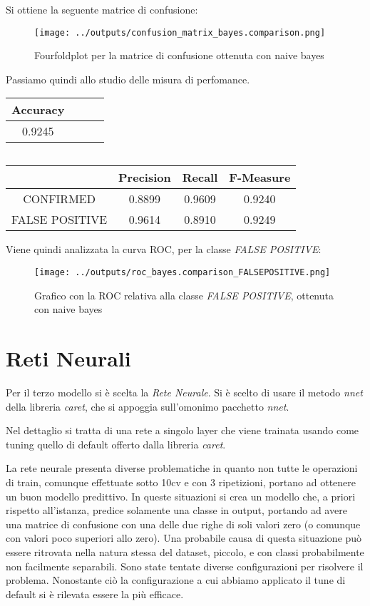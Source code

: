 Si ottiene la seguente matrice di confusione:
\begin{figure}[H]
    \centering
    \texttt{[image: ../outputs/confusion\_matrix\_bayes.comparison.png]}
    \caption{Fourfoldplot per la matrice di confusione ottenuta con naive bayes}
\end{figure}
Passiamo quindi allo studio delle misura di perfomance.
\begin{center}
    \begin{tabular}{| c | c c c |} 
    \hline
    Accuracy \\ [0.5ex] 
    \hline\hline
    0.9245 \\ 
    \hline
    \end{tabular}
    $\qquad$
    \begin{tabular}{| c | c c c |} 
    \hline
    & Precision & Recall & F-Measure \\ [0.5ex] 
    \hline\hline
    CONFIRMED & 0.8899 & 0.9609 & 0.9240 \\ 
    \hline
    FALSE POSITIVE & 0.9614 & 0.8910 & 0.9249 \\ 
    \hline
    \end{tabular}
\end{center}

Viene quindi analizzata la curva ROC, per la classe \textit{FALSE POSITIVE}:
\begin{figure}[H]
    \centering
    \texttt{[image: ../outputs/roc\_bayes.comparison\_FALSEPOSITIVE.png]}
    \caption{Grafico con la ROC relativa alla classe \textit{FALSE POSITIVE}, ottenuta con 
    naive bayes}
\end{figure}
\section{Reti Neurali}
Per il terzo modello si è scelta la \textit{Rete Neurale}.
Si è scelto di usare il metodo \textit{nnet} della libreria \textit{caret}, 
che si appoggia sull'omonimo pacchetto \textit{nnet}.

Nel dettaglio si tratta di una rete a singolo layer che viene trainata 
usando come tuning quello di default offerto dalla libreria \textit{caret}.

La rete neurale presenta diverse problematiche in quanto non tutte le operazioni
di train, comunque effettuate sotto 10cv e con 3 ripetizioni, portano ad 
ottenere un buon modello predittivo. In queste situazioni si crea un modello 
che, a priori rispetto all'istanza, predice solamente una classe in output, 
portando ad avere una matrice di confusione con una delle due righe di soli 
valori zero (o comunque con valori poco superiori allo zero). Una probabile 
causa di questa situazione può essere ritrovata nella natura stessa del dataset, 
piccolo, e con classi probabilmente non facilmente separabili. 
Sono state tentate diverse configurazioni per risolvere il problema. Nonostante 
ciò la configurazione a cui abbiamo applicato il tune di default si è rilevata 
essere la più efficace.

